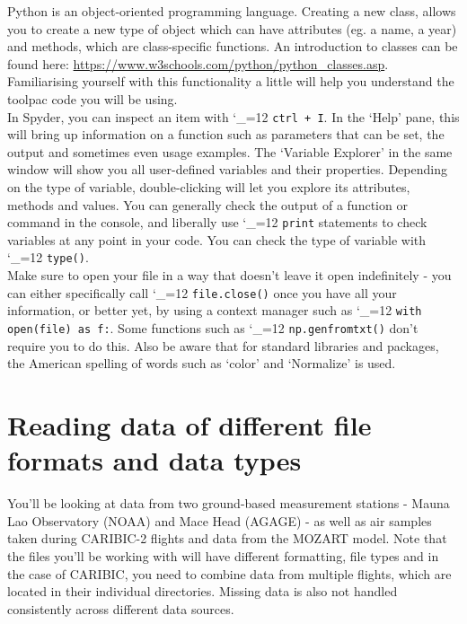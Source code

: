\documentclass{article}
\makeatletter
\newcommand{\pyf}{%
  \begingroup\catcode`_=12
  \pyf@
}
\newcommand{\pyf@}[1]{\texttt{#1}\endgroup}
\theoremstyle{definition}
\makeatother
\begin{document}
Python is an object-oriented programming language. Creating a new class, allows you to create a new type of object which can have attributes (eg. a name, a year) and methods, which are class-specific functions. An introduction to classes can be found here: \url{https://www.w3schools.com/python/python_classes.asp}. Familiarising yourself with this functionality a little will help you understand the toolpac code you will be using.\\

In Spyder, you can inspect an item with \pyf{ctrl + I}. In the `Help' pane, this will bring up information on a function such as parameters that can be set, the output and sometimes even usage examples. The `Variable Explorer'  in the same window will show you all user-defined variables and their properties. Depending on the type of variable, double-clicking will let you explore its attributes, methods and values. You can generally check the output of a function or command in the console, and liberally use \pyf{print} statements to check variables at any point in your code. You can check the type of variable with \pyf{type()}. \\

Make sure to open your file in a way that doesn't leave it open indefinitely - you can either specifically call \pyf{file.close()} once you have all your information, or better yet, by using a context manager such as  \pyf{with open(file) as f:}. Some functions such as \pyf{np.genfromtxt()} don't require you to do this.  Also be aware that for standard libraries and packages, the American spelling of words such as `color' and `Normalize' is used. 

\section{Reading data of different file formats and data types}
You'll be looking at data from two ground-based measurement stations - Mauna Lao Observatory (NOAA) and Mace Head (AGAGE) - as well as air samples taken during CARIBIC-2 flights and data from the MOZART model. Note that the files you'll be working with will have different formatting, file types and in the case of CARIBIC, you need to combine data from multiple flights, which are located in their individual directories. Missing data is also not handled consistently across different data sources. 
\end{document}
